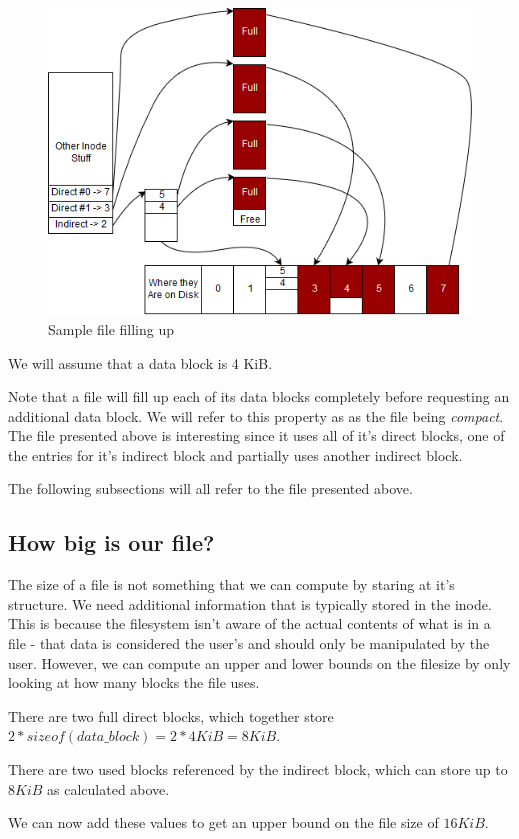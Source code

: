 \begin{figure}[htbp]
\centering
\includegraphics[width=.8\textwidth]{filesystems/images/sample_file.png}
\caption{Sample file filling up}
\end{figure}

We will assume that a data block is 4 KiB.

Note that a file will fill up each of its data blocks completely before requesting an additional data block.
We will refer to this property as as the file being \textit{compact}.
The file presented above is interesting since it uses all of it's direct blocks, one of the entries for it's indirect block and partially uses another indirect block.

The following subsections will all refer to the file presented above.

\subsection{How big is our file?}
The size of a file is not something that we can compute by staring at it's structure.
We need additional information that is typically stored in the inode.
This is because the filesystem isn't aware of the actual contents of what is in a file - that data is considered the user's and should only be manipulated by the user.
However, we can compute an upper and lower bounds on the filesize by only looking at how many blocks the file uses.

There are two full direct blocks, which together store $2*sizeof(data\_block)=2*4KiB=8KiB$.

There are two used blocks referenced by the indirect block, which can store up to $8KiB$ as calculated above.

We can now add these values to get an upper bound on the file size of $16KiB$.

